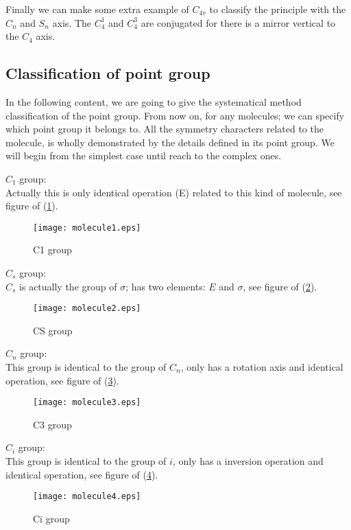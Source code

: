 Finally we can make some extra example of $C_{4v}$ to classify the
principle with the $C_{n}$ and $S_{n}$ axis. The $C^{1}_{4}$ and
$C^{3}_{4}$ are conjugated for there is a mirror vertical to the
$C_{4}$ axis.

\subsection{Classification of point group}
%
%
%
In the following content, we are going to give the systematical method
classification of the point group. From now on, for any molecules; we
can specify which point group it belongs to. All the symmetry
characters related to the molecule, is wholly demonstrated by the
details defined in its point group. We will begin from the simplest
case until reach to the complex ones.

$C_{1}$ group: \\
Actually this is only identical operation (E) related to this kind of
molecule, see figure of (\ref{GROUP1}).
\begin{figure}[htp]
  \begin{center}
    \texttt{[image: molecule1.eps]}
    \caption{C1 group} \label{GROUP1}
  \end{center}
\end{figure}

$C_{s}$ group: \\
$C_{s}$ is actually the group of $\sigma$; has two elements: $E$ and
$\sigma$, see figure of (\ref{GROUP2}).
\begin{figure}[htp]
  \begin{center}
    \texttt{[image: molecule2.eps]}
    \caption{CS group} \label{GROUP2}
  \end{center}
\end{figure}

$C_{n}$ group: \\
This group is identical to the group of $C_{n}$, only has a rotation
axis and identical operation, see figure of (\ref{GROUP3}).
\begin{figure}[htp]
  \begin{center}
    \texttt{[image: molecule3.eps]}
    \caption{C3 group} \label{GROUP3}
  \end{center}
\end{figure}

$C_{i}$ group: \\
This group is identical to the group of $i$, only has a inversion
operation and identical operation, see figure of (\ref{GROUP4}).
\begin{figure}[htp]
  \begin{center}
    \texttt{[image: molecule4.eps]}
    \caption{Ci group} \label{GROUP4}
  \end{center}
\end{figure}

